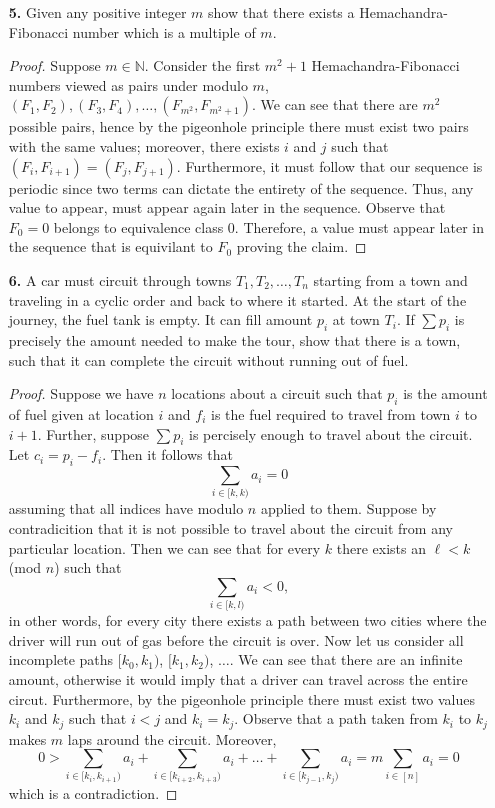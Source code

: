 \documentclass[ 12pt ]{article}
\begin{document}
\begin{enumerate}
	\item[\textbf{5.}] Given any positive integer $m$ show that there exists a Hemachandra-Fibonacci number which is a multiple of $m$.

		\begin{proof}
			Suppose $m \in \mathbb{N}$. Consider the first $m^2 + 1$ Hemachandra-Fibonacci numbers viewed as pairs under modulo $m$, $(F_1, F_2), (F_3, F_4), \hdots, (F_{m^2}, F_{m^2+1})$.
			We can see that there are $m^2$ possible pairs, hence by the pigeonhole principle there must exist two pairs with the same values; moreover, there exists $i$ and $j$ such
			that $(F_i, F_{i+1}) = (F_j, F_{j+1})$. Furthermore, it must follow that our sequence is periodic since two terms can dictate the entirety of the sequence. Thus, any value
			to appear, must appear again later in the sequence. Observe that $F_0 = 0$ belongs to equivalence class 0. Therefore, a value must appear later in the sequence that is
			equivilant to $F_0$ proving the claim.
		\end{proof}


	\item[\textbf{6.}] A car must circuit through towns $T_1, T_2, \hdots, T_n$ starting from a town and traveling in a cyclic order and back to where it started. At the start of the
		journey, the fuel tank is empty. It can fill amount $p_i$ at town $T_i$. If $\sum p_i$ is precisely the amount needed to make the tour, show that there is a town, such that it
		can complete the circuit without running out of fuel.

		\begin{proof}
			Suppose we have $n$ locations about a circuit such that $p_i$ is the amount of fuel given at location $i$ and $f_i$ is the fuel required to travel from town $i$ to $i+1$.
			Further, suppose $\sum p_i$ is percisely enough to travel about the circuit. Let $c_i = p_i - f_i$. Then it follows that $$\sum_{i \in [k, k)} a_i = 0$$ assuming that
			all indices have modulo $n$ applied to them. Suppose by contradicition that it is not possible to travel about the circuit from any particular location. Then we can
			see that for every $k$ there exists an $\ell < k$ (mod $n$) such that $$\sum_{i \in [k, l)} a_i < 0,$$ in other words, for every city there exists a path between two
			cities where the driver will run out of gas before the circuit is over. Now let us consider all incomplete paths $[k_0, k_1)$, $[k_1, k_2)$, $\hdots$. We can see that there
			are an infinite amount, otherwise it would imply that a driver can travel across the entire circut. Furthermore, by the pigeonhole principle there must exist two values
			$k_i$ and $k_j$ such that $i < j$ and $k_i = k_j$. Observe that a path taken from $k_i$ to $k_j$ makes $m$ laps around the circuit. Moreover,
			$$0 > \sum_{i \in [k_i, k_{i+1})} a_i + \sum_{i \in [k_{i+2}, k_{i+3})} a_i + \hdots + \sum_{i \in [k_{j-1}, k_j)} a_i = m \sum_{i \in [n]} a_i = 0$$ which is a contradiction.
		\end{proof}

\end{enumerate}
\end{document}
